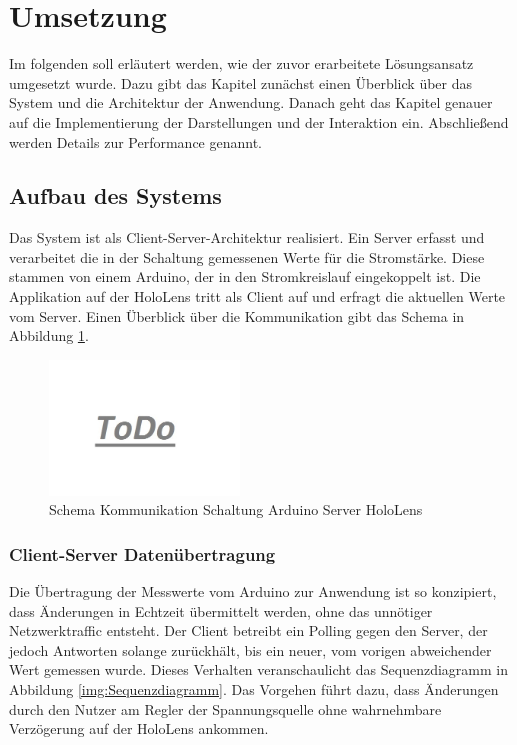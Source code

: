 \section{Umsetzung}
\label{sec-5}

Im folgenden soll erläutert werden, wie der zuvor erarbeitete Lösungsansatz umgesetzt wurde. Dazu gibt das Kapitel zunächst einen Überblick über das System und die Architektur der Anwendung. Danach geht das Kapitel genauer auf die Implementierung der Darstellungen und der Interaktion ein. Abschließend werden Details zur Performance genannt.

\subsection{Aufbau des Systems}
\label{sec-5-1}
Das System ist als Client-Server-Architektur realisiert. Ein Server erfasst und verarbeitet die in der Schaltung gemessenen Werte für die Stromstärke. Diese stammen von einem Arduino, der in den Stromkreislauf eingekoppelt ist. Die Applikation auf der HoloLens tritt als Client auf und erfragt die aktuellen Werte vom Server. Einen Überblick über die Kommunikation gibt das Schema in Abbildung \ref{img:communication-schema}. 
\begin{figure}[H]
	\centering
	\includegraphics[width=0.45\textwidth]{images/todo.jpg}
	\caption{Schema Kommunikation Schaltung Arduino Server HoloLens}
	\label{img:communication-schema}
\end{figure}

\subsubsection{Client-Server Datenübertragung}
\label{sec-5-1-1}
Die Übertragung der Messwerte vom Arduino zur Anwendung ist so konzipiert, dass Änderungen in Echtzeit übermittelt werden, ohne das unnötiger Netzwerktraffic entsteht. Der Client betreibt ein Polling gegen den Server, der jedoch Antworten solange zurückhält, bis ein neuer, vom vorigen abweichender Wert gemessen wurde. Dieses Verhalten veranschaulicht das Sequenzdiagramm in Abbildung \ref{img:Sequenzdiagramm}. Das Vorgehen führt dazu, dass Änderungen durch den Nutzer am Regler der Spannungsquelle ohne wahrnehmbare Verzögerung auf der HoloLens ankommen.


